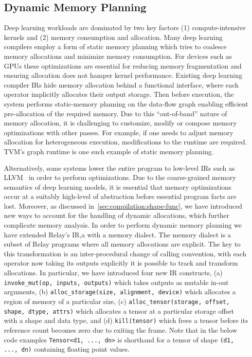 \subsection{Dynamic Memory Planning}
\label{subsec:optimizations:memory}

Deep learning workloads are dominated by two key factors
  (1) compute-intensive kernels and (2) memory consumption and allocation.
Many deep learning compilers employ a form of static memory planning which
  tries to coalesce memory allocations and minimize memory consumption.
For devices such as GPUs these optimizations are essential for reducing
  memory fragmentation and ensuring allocation does not hamper kernel performance.
Existing deep learning compiler IRs hide memory allocation behind a functional interface,
  where each operator implicitly allocates their output storage.
Then before execution, the system performs static-memory planning on the
  data-flow graph enabling efficient pre-allocation of the required memory.
Due to this ``out-of-band'' nature of memory allocation,
  it is challenging to customize, modify or compose memory optimizations with other passes.
For example, if one needs to adjust memory allocation for heterogeneous execution,
  modifications to the runtime are required.
TVM's graph runtime is one such example of static memory planning.

Alternatively, some systems lower the entire program to low-level IRs such as
  LLVM~\citep{llvm} in order to perform optimizations.
Due to the coarse-grained memory semantics of deep learning models,
  it is essential that memory optimizations occur at a suitably
  high-level of abstraction before essential program facts are lost.
Moreover, as discussed in~\autoref{sec:compilation:shape-func},
  we have introduced new ways to account for the handling of dynamic allocations,
  which further complicate memory analysis.
In order to perform dynamic memory planning we have extended Relay's IR,a
  with a memory dialect.
The memory dialect is a subset of Relay programs where all memory allocations are
  explicit.
The key to this transformation is an inter-procedural change of calling convention,
  with each operator now taking its outputs explicitly it is possible to track and transform allocations.
In particular, we have introduced four new IR constructs,
  (a) \verb|invoke_mut(op, inputs, outputs)| which takes outputs as mutable in-out arguments,
  (b) \texttt{alloc\_storage(size, alignment, device)} which allocates a region of memory of a particular size,
  (c) \texttt{alloc\_tensor(storage, offset, shape, dtype, attrs)} which allocates a tensor at a particular storage offset
    with a shape and data type, and
  (d) \verb|kill(tensor)| which frees a tensor before its reference count becomes zero due to exiting the frame.
Note that in the below code examples \texttt{Tensor<d1, ..., dn>}
is shorthand for a tensor of shape \texttt{(d1, ..., dn)} containing floating point values.

